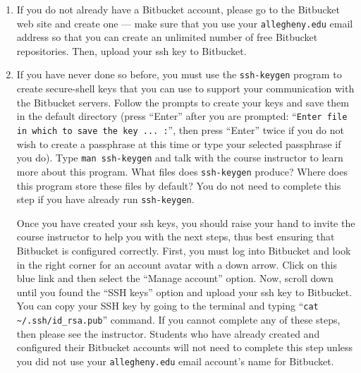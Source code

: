 \begin{enumerate}
  \setlength{\itemsep}{0pt}

  \item If you do not already have a Bitbucket account, please go to the Bitbucket web site and create one ---
    make sure that you use your {\tt allegheny.edu} email address so that you can create an unlimited number of free
    Bitbucket repositories. Then, upload your ssh key to Bitbucket.

  \item If you have never done so before, you must use the {\tt ssh-keygen} program to create secure-shell keys that you
    can use to support your communication with the Bitbucket servers. Follow the prompts to create your keys and save
    them in the default directory (press ``Enter'' after you are prompted: ``{\tt Enter file in which to save the key ...
        :}'', then press ``Enter'' twice if you do not wish to create a passphrase at this time or type your selected
      passphrase if you do).   Type {\tt man ssh-keygen} and talk with the course instructor to learn more about this
    program.  What files does {\tt ssh-keygen} produce?  Where does this program store these files by default?  You do
    not need to complete this step if you have already run {\tt ssh-keygen}.

    Once you have created your ssh keys, you should raise your hand to invite the course instructor to help you with the
    next steps, thus best ensuring that Bitbucket is configured correctly. First, you must log into Bitbucket and look
    in the right corner for an account avatar with a down arrow.  Click on this blue link and then select the ``Manage
    account'' option. Now, scroll down until you found the ``SSH keys'' option and upload your ssh key to Bitbucket. You
    can copy your SSH key by going to the terminal and typing ``{\tt cat \textasciitilde{}/.ssh/id\_rsa.pub}'' command.
    If you cannot complete any of these steps, then please see the instructor. Students who have already created
    and configured their Bitbucket accounts will not need to complete this step unless you did not use your
    {\tt allegheny.edu} email account's name for Bitbucket.


\end{enumerate}
